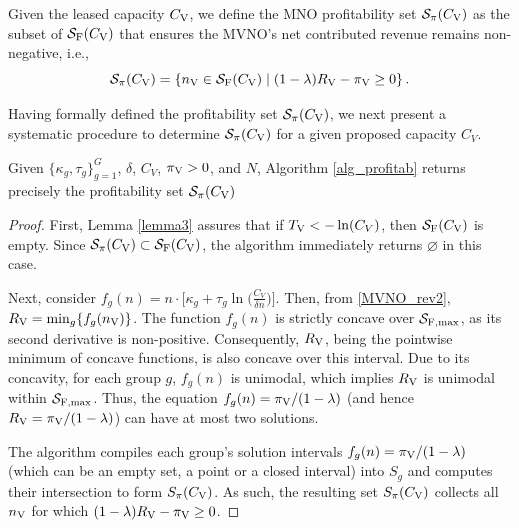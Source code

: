 \documentclass[12pt, draftclsnofoot, onecolumn]{IEEEtran}
\begin{document}
		\begin{definition}\label{Def_profit}
			Given the leased capacity \( C_{\rm V} \), we define the MNO profitability set \( \mathcal{S}_{\pi }(C_{\rm V})\) as the subset of \( \mathcal{S}_{\rm F}(C_{\rm V}) \) that ensures the MVNO’s net contributed revenue remains non-negative, i.e.,  
			\begin{equation}\label{profit-set}
				\mathcal{S}_{\pi }(C_{\rm V})= \left\{n_{\rm V}\in \mathcal{S}_{\rm F}(C_{\rm V}) \mid (1-\lambda) R_{\rm V} - \pi_{\rm V} \geq 0\right\}.
			\end{equation}
		\end{definition}
		Having formally defined the profitability set \(\mathcal{S}_{\pi}(C_{\rm V})\), we next present a systematic procedure to determine \(\mathcal{S}_{\pi}(C_{\rm V})\) for a given proposed capacity \(C_V\). 	
		\begin{theorem}
			\label{thm:ProfitabilitySet}
			Given \(\{\kappa_g,\tau_g\}_{g=1}^G\), \(\delta\), \(C_V\), \(\pi_{\rm V}>0\), and \(N\), Algorithm \ref{alg_profitab} returns precisely the profitability set $\mathcal{S}_{\pi}(C_{\rm V})$ 
		\end{theorem}
		\begin{proof}
			First, Lemma \ref{lemma3} assures that if \( T_{\rm V} < -\ln(C_V) \), then \( \mathcal{S}_{\rm F}(C_{\rm V}) \) is empty. Since \( \mathcal{S}_{\pi}(C_{\rm V}) \subset \mathcal{S}_{\rm F}(C_{\rm V}) \), the algorithm immediately returns \( \varnothing \) in this case. 
			
			Next, consider \( f_g(n) = n\cdot \bigl[\kappa_g + \tau_g \ln\bigl(\frac{C_V}{\delta n}\bigr)\bigr] \). Then, from \eqref{MVNO_rev2}, \( R_{\rm V} = \min_g \{f_g(n_{\rm V})\} \). The function \( f_g(n) \) is strictly concave over \( \mathcal{S}_{\rm F,max} \), as its second derivative is non-positive. Consequently, \( R_{\rm V} \), being the pointwise minimum of concave functions, is also concave over this interval. Due to its concavity, for each group \( g \), \( f_g(n) \) is unimodal, which implies \( R_{\rm V} \) is unimodal within \( \mathcal{S}_{\rm F,max} \). Thus, the equation \( f_g(n) = \pi_{\rm V}/(1-\lambda) \) (and hence \( R_{\rm V} = \pi_{\rm V}/(1-\lambda) \)) can have at most two solutions. 
			
			The algorithm compiles each group's solution intervals \( f_g(n) = \pi_{\rm V}/(1-\lambda) \) (which can be an empty set, a point or a closed interval) into \( S_g \) and computes their intersection to form \( S_{\pi}(C_{\rm V}) \). As such, the resulting set \( S_{\pi}(C_{\rm V}) \)  collects all \( n_{\rm V} \) for which  \((1-\lambda)R_{\rm V}-\pi_{\rm V}\geq 0 \). 
		\end{proof}
		
\end{document}
